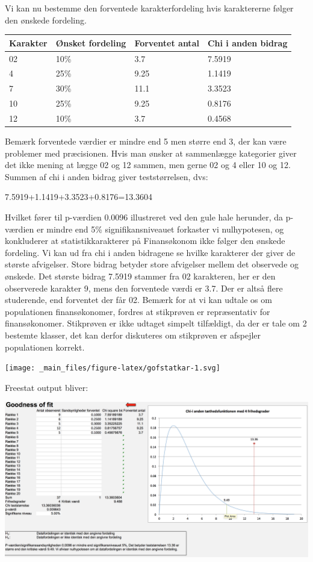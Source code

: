 \documentclass[]{book}
\begin{document}
Vi kan nu bestemme den forventede karakterfordeling hvis karaktererne følger den ønskede fordeling.

\begin{longtable}[]{@{}llll@{}}
\toprule
Karakter & Ønsket fordeling & Forventet antal & Chi i anden bidrag\tabularnewline
\midrule
\endhead
02 & 10\% & 3.7 & 7.5919\tabularnewline
4 & 25\% & 9.25 & 1.1419\tabularnewline
7 & 30\% & 11.1 & 3.3523\tabularnewline
10 & 25\% & 9.25 & 0.8176\tabularnewline
12 & 10\% & 3.7 & 0.4568\tabularnewline
\bottomrule
\end{longtable}

Bemærk forventede værdier er mindre end 5 men større end 3, der kan være problemer med præcisionen. Hvis man ønsker at sammenlægge kategorier giver det ikke mening at lægge 02 og 12 sammen, men gerne 02 og 4 eller 10 og 12. Summen af chi i anden bidrag giver teststørrelsen, dvs:

7.5919+1.1419+3.3523+0.8176=13.3604

Hvilket fører til p-værdien 0.0096 illustreret ved den gule hale herunder, da p-værdien er mindre end 5\% signifikansniveauet forkaster vi nulhypotesen, og konkluderer at statistikkarakterer på Finansøkonom ikke følger den ønskede fordeling. Vi kan ud fra chi i anden bidragene se hvilke karakterer der giver de største afvigelser. Store bidrag betyder store afvigelser mellem det observede og ønskede. Det største bidrag 7.5919 stammer fra 02 karakteren, her er den observerede karakter 9, mens den forventede værdi er 3.7. Der er altså flere studerende, end forventet der får 02. Bemærk for at vi kan udtale os om populationen finansøkonomer, fordres at stikprøven er repræsentativ for finansøkonomer. Stikprøven er ikke udtaget simpelt tilfældigt, da der er tale om 2 bestemte klasser, det kan derfor diskuteres om stikprøven er afspejler populationen korrekt.

\texttt{[image: \_main\_files/figure-latex/gofstatkar-1.svg]}

Freestat output bliver:

\includegraphics{img/gof.png}
\end{document}
